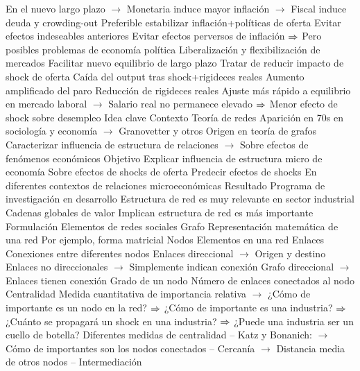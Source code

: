 \documentclass{nuevotema}
\begin{document}
\begin{esquemal}
				\4[] En el nuevo largo plazo
				\4[] $\to$ Monetaria induce mayor inflación
				\4[] $\to$ Fiscal induce deuda y crowding-out
				\4 Preferible estabilizar inflación+políticas de oferta
				\4[] Evitar efectos indeseables anteriores
				\4[] Evitar efectos perversos de inflación
				\4[] $\Rightarrow$ Pero posibles problemas de economía política
			\3 Liberalización y flexibilización de mercados
				\4 Facilitar nuevo equilibrio de largo plazo
				\4[] Tratar de reducir impacto de shock de oferta
				\4 Caída del output tras shock+rigideces reales
				\4[] Aumento amplificado del paro
				\4 Reducción de rigideces reales
				\4[] Ajuste más rápido a equilibrio en mercado laboral
				\4[] $\to$ Salario real no permanece elevado
				\4[] $\Rightarrow$ Menor efecto de shock sobre desempleo
	\1 
		\2 Idea clave
			\3 Contexto
				\4 Teoría de redes
				\4[] Aparición en 70s en sociología y economía
				\4[] $\to$ Granovetter y otros
				\4[] Origen en teoría de grafos
				\4[] Caracterizar influencia de estructura de relaciones
				\4[] $\to$ Sobre efectos de fenómenos económicos
			\3 Objetivo
				\4 Explicar influencia de estructura micro de economía
				\4[] Sobre efectos de shocks de oferta
				\4 Predecir efectos de shocks
				\4[] En diferentes contextos de relaciones microeconómicas
			\3 Resultado
				\4 Programa de investigación en desarrollo
				\4 Estructura de red es muy relevante en sector industrial
				\4 Cadenas globales de valor
				\4[] Implican estructura de red es más importante
		\2 Formulación
			\3 Elementos de redes sociales
				\4 Grafo
				\4[] Representación matemática de una red
				\4[] Por ejemplo, forma matricial
				\4 Nodos
				\4[] Elementos en una red
				\4 Enlaces
				\4[] Conexiones entre diferentes nodos
				\4[] Enlaces direccional
				\4[] $\to$ Origen y destino
				\4[] Enlaces no direccionales
				\4[] $\to$ Simplemente indican conexión
				\4[] Grafo direccional
				\4[] $\to$ Enlaces tienen conexión
				\4 Grado de un nodo
				\4[] Número de enlaces conectados al nodo
			\3 Centralidad
				\4 Medida cuantitativa de importancia relativa
				\4[] $\to$ ¿Cómo de importante es un nodo en la red?
				\4[] $\Rightarrow$ ¿Cómo de importante es una industria?
				\4[] $\Rightarrow$ ¿Cuánto se propagará un shock en una industria?
				\4[] $\Rightarrow$ ¿Puede una industria ser un cuello de botella?
				\4 Diferentes medidas de centralidad
				\4[] -- Katz y Bonanich:
				\4[] $\to$ Cómo de importantes son los nodos conectados
				\4[] -- Cercanía
				\4[] $\to$ Distancia media de otros nodos
				\4[] -- Intermediación

\end{esquemal}
\end{document}
